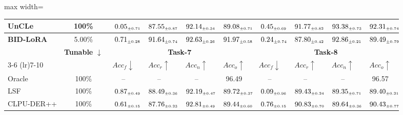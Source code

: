 \begin{table}[!htbp]
\begin{adjustbox}{max width=\textwidth}
\begin{tabular}{l|c|cccc|cccc}
UnCLe & 100\% & $\kern6pt0.05_{\scriptscriptstyle \pm 0.71}\kern-6pt$ & $\kern6pt87.55_{\scriptscriptstyle \pm 0.87}\kern-6pt$ & \colorbox{yellow!35}{$\kern6pt92.14_{\scriptscriptstyle \pm 0.34}\kern-6pt$} & $\kern6pt89.08_{\scriptscriptstyle \pm 0.71}\kern-6pt$ & $\kern6pt0.45_{\scriptscriptstyle \pm 0.69}\kern-6pt$ & \colorbox{green!25}{$\kern6pt91.77_{\scriptscriptstyle \pm 0.82}\kern-6pt$} & \colorbox{yellow!35}{$\kern6pt93.38_{\scriptscriptstyle \pm 0.73}\kern-6pt$} & \colorbox{green!25}{$\kern6pt92.31_{\scriptscriptstyle \pm 0.74}\kern-6pt$} \\
\midrule
\rowcolor{pink!15}
\textbf{BID-LoRA} & 5.00\% & $\kern6pt0.71_{\scriptscriptstyle \pm 0.28}\kern-6pt$ & \colorbox{green!25}{$\kern6pt91.64_{\scriptscriptstyle \pm 0.74}\kern-6pt$} & \colorbox{green!25}{$\kern6pt92.63_{\scriptscriptstyle \pm 0.26}\kern-6pt$} & \colorbox{green!25}{$\kern6pt91.97_{\scriptscriptstyle \pm 0.58}\kern-6pt$} & $\kern6pt0.24_{\scriptscriptstyle \pm 0.74}\kern-6pt$ & $\kern6pt87.80_{\scriptscriptstyle \pm 0.42}\kern-6pt$ & $\kern6pt92.86_{\scriptscriptstyle \pm 0.21}\kern-6pt$ & $\kern6pt89.49_{\scriptscriptstyle \pm 0.79}\kern-6pt$ \\
\midrule
\addlinespace[0.05cm]
\midrule
\toprule
\multirow{2}{*}{\textbf{Method}} & \multirow{2}{*}{\textbf{Tunable} $\downarrow$}
& \multicolumn{4}{c|}{\textbf{Task-7}} & \multicolumn{4}{c}{\textbf{Task-8}} \\
\cmidrule(lr){3-6} \cmidrule(lr){7-10}
& & $Acc_f \downarrow$ & $Acc_r \uparrow$ & $Acc_n \uparrow$ & $Acc_o \uparrow$
& $Acc_f \downarrow$ & $Acc_r \uparrow$ & $Acc_n \uparrow$ & $Acc_o \uparrow$ \\
\midrule
Oracle        & 100\% & -- & -- & -- & 96.49 & -- & -- & -- & 96.57 \\
\midrule
LSF & 100\% & $\kern6pt0.87_{\scriptscriptstyle \pm 0.49}\kern-6pt$ & $\kern6pt88.49_{\scriptscriptstyle \pm 0.36}\kern-6pt$ & $\kern6pt92.19_{\scriptscriptstyle \pm 0.47}\kern-6pt$ & $\kern6pt89.72_{\scriptscriptstyle \pm 0.37}\kern-6pt$ & $\kern6pt0.09_{\scriptscriptstyle \pm 0.96}\kern-6pt$ & $\kern6pt89.43_{\scriptscriptstyle \pm 0.24}\kern-6pt$ & $\kern6pt89.35_{\scriptscriptstyle \pm 0.71}\kern-6pt$ & $\kern6pt89.40_{\scriptscriptstyle \pm 0.21}\kern-6pt$ \\
CLPU-DER++ & 100\% & $\kern6pt0.61_{\scriptscriptstyle \pm 0.15}\kern-6pt$ & $\kern6pt87.76_{\scriptscriptstyle \pm 0.23}\kern-6pt$ & $\kern6pt92.81_{\scriptscriptstyle \pm 0.49}\kern-6pt$ & $\kern6pt89.44_{\scriptscriptstyle \pm 0.60}\kern-6pt$ & $\kern6pt0.76_{\scriptscriptstyle \pm 0.15}\kern-6pt$ & \colorbox{yellow!35}{$\kern6pt90.83_{\scriptscriptstyle \pm 0.70}\kern-6pt$} & $\kern6pt89.64_{\scriptscriptstyle \pm 0.36}\kern-6pt$ & $\kern6pt90.43_{\scriptscriptstyle \pm 0.77}\kern-6pt$ \\

\end{tabular}
\end{adjustbox}
\end{table}
